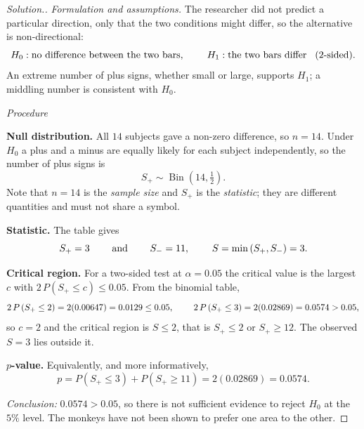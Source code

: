 \documentclass[11pt,a4paper]{article}
\theoremstyle{definition}
\newenvironment{solution}
  {\renewcommand{\qedsymbol}{}\begin{proof}[\textit{Solution}.]}
  {\end{proof}}
\begin{document}
\begin{solution}
\textit{Formulation and assumptions.} The researcher did not predict a particular
direction, only that the two conditions might differ, so the alternative is
non-directional:
$$H_0:\text{no difference between the two bars},\hspace{0.8cm}
H_1:\text{the two bars differ}\hspace{0.3cm}(\text{2-sided}).$$
An extreme number of plus signs, whether small or large, supports $H_1$; a middling
number is consistent with $H_0$.







\textit{Procedure}

\textbf{Null distribution.} All $14$ subjects gave a non-zero difference, so
$n=14$. Under $H_0$ a plus and a minus are equally likely for each subject
independently, so the number of plus signs is
$$S_+\sim \operatorname{Bin}\left(14,\tfrac{1}{2}\right).$$
Note that $n=14$ is the \emph{sample size} and $S_+$ is the \emph{statistic}; they
are different quantities and must not share a symbol.

\textbf{Statistic.} The table gives
$$S_+=3\hspace{0.8cm}\text{and}\hspace{0.8cm}S_-=11,\hspace{0.8cm}
S=\min\left(S_+,S_-\right)=3 .$$

\textbf{Critical region.} For a two-sided test at $\alpha=0.05$ the critical value
is the largest $c$ with $2\,P\left(S_+\leq c\right)\leq 0.05$. From the binomial
table,
$$2\,P\left(S_+\leq 2\right)=2(0.00647)=0.0129\leq 0.05,\hspace{0.8cm}
2\,P\left(S_+\leq 3\right)=2(0.02869)=0.0574>0.05,$$
so $c=2$ and the critical region is $S\leq 2$, that is $S_+\leq 2$ or
$S_+\geq 12$. The observed $S=3$ lies outside it.

\textbf{$p$-value.} Equivalently, and more informatively,
$$p=P\left(S_+\leq 3\right)+P\left(S_+\geq 11\right)=2(0.02869)=0.0574 .$$

\textit{Conclusion:} $0.0574>0.05$, so there is not sufficient evidence to reject
$H_0$ at the $5\%$ level. The monkeys have not been shown to prefer one area to the
other.
\end{solution}
\end{document}
